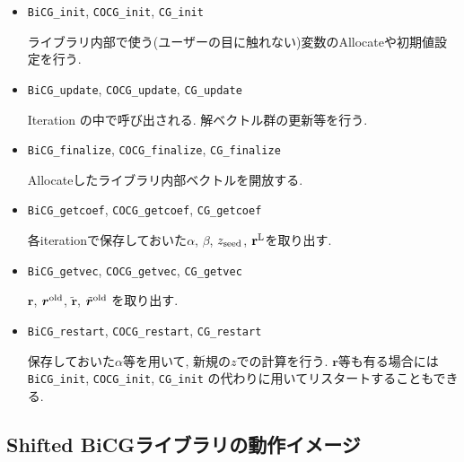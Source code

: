 \documentclass[12pt,titlepage]{jarticle}
\begin{document}
\begin{itemize}
\item \verb|BiCG_init|, \verb|COCG_init|, \verb|CG_init|

ライブラリ内部で使う(ユーザーの目に触れない)変数のAllocateや初期値設定を行う.

\item \verb|BiCG_update|, \verb|COCG_update|, \verb|CG_update|

Iteration の中で呼び出される. 解ベクトル群の更新等を行う.


\item \verb|BiCG_finalize|, \verb|COCG_finalize|, \verb|CG_finalize|

Allocateしたライブラリ内部ベクトルを開放する.

\item \verb|BiCG_getcoef|, \verb|COCG_getcoef|, \verb|CG_getcoef|

各iterationで保存しておいた$\alpha$, $\beta$, $z_{\rm seed}$, ${\bf r}^{\rm L}$を取り出す.

\item \verb|BiCG_getvec|, \verb|COCG_getvec|, \verb|CG_getvec|

${\boldsymbol r}$, ${\boldsymbol r}^{\rm old}$, 
${\tilde {\boldsymbol r}}$, ${\tilde {\boldsymbol r}}^{\rm old}$
を取り出す.

\item \verb|BiCG_restart|, \verb|COCG_restart|, \verb|CG_restart|

保存しておいた$\alpha$等を用いて, 新規の$z$での計算を行う.
${\boldsymbol r}$等も有る場合には
\verb|BiCG_init|, \verb|COCG_init|, \verb|CG_init|
の代わりに用いてリスタートすることもできる.

\end{itemize}

\subsection{Shifted BiCGライブラリの動作イメージ}%
\end{document}
